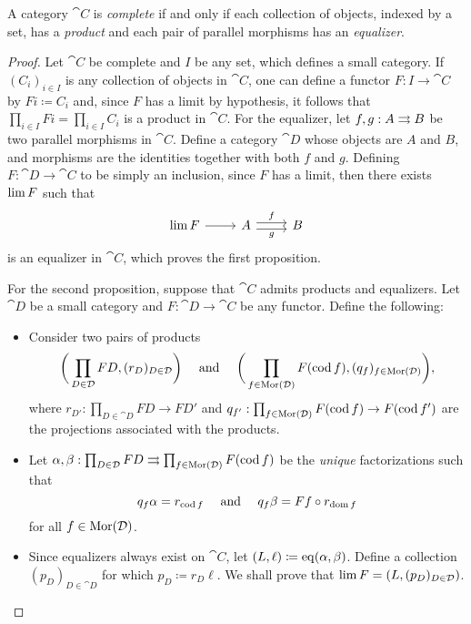 \begin{theorem}
\label{thm:complete-category-prod-eq}
A category \(\cat C\) is \emph{complete} if and only if each collection of
objects, indexed by a set, has a \emph{product} and each pair of parallel
morphisms has an \emph{equalizer}.
\end{theorem}

\begin{proof}
Let \(\cat C\) be complete and \(I\) be any set, which defines a small
category. If \((C_i)_{i \in I}\) is any collection of objects in \(\cat C\), one
can define a functor \(F: I \to \cat C\) by \(F i \coloneq C_i\) and, since
\(F\) has a limit by hypothesis, it follows that
\(\prod_{i \in I} F i = \prod_{i \in I} C_i\) is a product in \(\cat C\). For
the equalizer, let \(f, g: A \rightrightarrows B\) be two parallel morphisms in \(\cat
C\). Define a category \(\cat D\) whose objects are \(A\) and \(B\), and
morphisms are the identities together with both \(f\) and \(g\). Defining \(F:
\cat D \to \cat C\) to be simply an inclusion, since \(F\) has a limit, then
there exists \(\operatorname{lim} F\) such that
\[
\begin{tikzcd}
\Lim F \ar[r] &A \ar[r, shift left, "f"] \ar[r, shift right, "g"']
&B
\end{tikzcd}
\]
is an equalizer in \(\cat C\), which proves the first proposition.

For the second proposition, suppose that \(\cat C\) admits products and
equalizers. Let \(\cat D\) be a small category and \(F: \cat D \to \cat C\) be
any functor. Define the following:

\begin{itemize}\setlength\itemsep{0em}
\item Consider two pairs of products
  \[
  \bigg(\prod_{D \in \mathcal D} F D, (r_D)_{D \in \mathcal D}\bigg)
  \quad\text{ and }\quad
  \bigg(\prod_{f \in \operatorname{Mor}(\mathcal D)} F(\operatorname{cod} f),
    (q_f)_{f \in \operatorname{Mor}(\mathcal D)}\bigg),
  \]
  where \(r_{D'}: \prod_{D \in \cat D} F D \to F D'\) and
  \(q_{f'}: \prod_{f \in \operatorname{Mor}(\mathcal D)} F (\operatorname{cod} f) \to F (\operatorname{cod} f')\) are the
  projections associated with the products.

\item Let
  \(\alpha, \beta: \prod_{D \in \mathcal D} F D \rightrightarrows \prod_{f \in \operatorname{Mor}(\mathcal D)} F
  (\operatorname{cod} f)\) be the \emph{unique} factorizations such that
  \[
  q_f \alpha = r_{\operatorname{cod} f}
  \quad\text{ and }\quad
  q_f \beta = F f \circ r_{\operatorname{dom} f}
  \]
  for all \(f \in \operatorname{Mor}(\mathcal D)\).
\item Since equalizers always exist on \(\cat C\), let
  \((L, \ell) \coloneq \operatorname{eq}(\alpha, \beta)\). Define a collection
  \((p_D)_{D \in \cat D}\) for which \(p_D \coloneq r_D \ell\). We shall prove
  that \(\operatorname{lim} F = (L, (p_D)_{D \in \mathcal D})\).
\end{itemize}


\end{proof}
